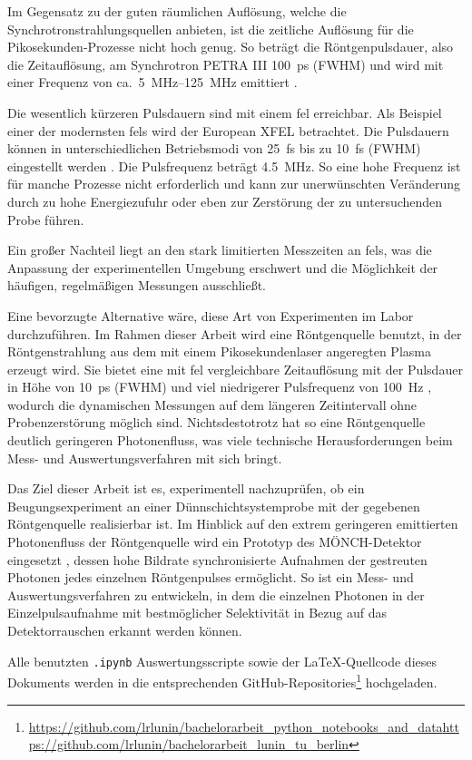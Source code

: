 \noindent
Im Gegensatz zu der guten räumlichen Auflösung, welche die Synchrotronstrahlungsquellen anbieten, ist die zeitliche Auflösung für die Pikosekunden-Prozesse nicht hoch genug. So beträgt die Röntgenpulsdauer, also die Zeitauflösung, am Synchrotron PETRA III  \SI{100}{\pico\second} (FWHM) und wird mit einer Frequenz von ca.\ \SIrange[range-units = single]{5}{125}{\mega\hertz} emittiert \cite{noauthor_machine_nodate}.

\noindent
Die wesentlich kürzeren Pulsdauern sind mit einem \gls{fel} erreichbar. Als Beispiel einer der mo\-dern\-sten \gls{fel}s wird der European XFEL betrachtet. Die Pulsdauern können in unterschiedlichen Betriebsmodi von \SI{25}{\femto\second} bis zu \SI{10}{\femto\second} (FWHM) eingestellt werden \cite{tschentscher_photon_2017}. Die Pulsfrequenz beträgt \SI{4,5}{\mega\hertz}. So eine hohe Frequenz ist für manche Prozesse nicht erforderlich und kann zur unerwünschten Veränderung durch zu hohe Energiezufuhr oder eben zur Zerstörung der zu untersuchenden Probe führen. 

\noindent
Ein großer Nachteil liegt an den stark limitierten Messzeiten an \gls{fel}s, was die Anpassung der experimentellen Umgebung erschwert und die Möglichkeit der häufigen, regelmäßigen Messungen ausschließt.

\noindent
Eine bevorzugte Alternative wäre, diese Art von Experimenten im Labor durchzuführen. Im Rahmen dieser Arbeit wird eine Röntgenquelle benutzt, in der Röntgenstrahlung aus dem mit einem Pikosekundenlaser angeregten Plasma erzeugt wird. Sie bietet eine mit \gls{fel} vergleichbare Zeitauflösung mit der Pulsdauer in Höhe von \SI{10}{\pico\second} (FWHM) und viel niedrigerer Pulsfrequenz von \SI{100}{\hertz} \cite{schick_laser-driven_2021}, wodurch die dynamischen Messungen auf dem längeren Zeitintervall ohne Probenzerstörung möglich sind. Nichtsdestotrotz hat so eine Röntgenquelle deutlich geringeren Photonenfluss, was viele technische Herausforderungen beim Mess- und Auswertungsverfahren mit sich bringt.

\noindent
Das Ziel dieser Arbeit ist es, experimentell nachzuprüfen, ob ein Beugungsexperiment an einer Dünnschichtsystemprobe mit der gegebenen Röntgenquelle realisierbar ist. Im Hinblick auf den extrem geringeren emittierten Photonenfluss der Röntgenquelle wird ein Prototyp des MÖNCH-Detektor eingesetzt \cite{ramilli-measurements-2017}, dessen hohe Bildrate synchronisierte Aufnahmen der gestreuten Photonen jedes einzelnen Röntgenpulses ermöglicht. So ist ein Mess- und Auswertungsverfahren zu entwickeln, in dem die einzelnen Photonen in der Einzelpulsaufnahme mit bestmöglicher Selektivität in Bezug auf das Detektorrauschen erkannt werden können.

\noindent
Alle benutzten \texttt{.ipynb} Auswertungsscripte sowie der \LaTeX-Quellcode dieses Dokuments werden in die entsprechenden GitHub-Repositories\footnote{\url{https://github.com/lrlunin/bachelorarbeit_python_notebooks_and_data}\newline\url{https://github.com/lrlunin/bachelorarbeit_lunin_tu_berlin}} hochgeladen.